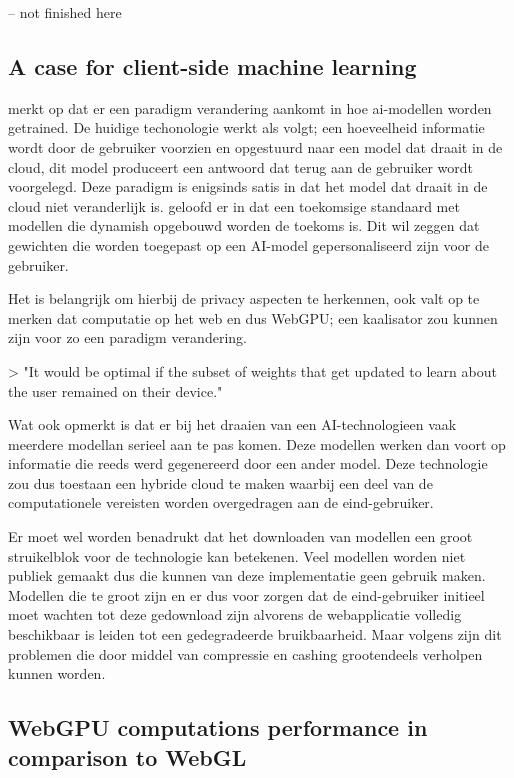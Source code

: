 -- not finished here


\subsection{A case for client-side machine learning} %

\textcite{Fleetwood2022} merkt op dat er een paradigm verandering aankomt in hoe ai-modellen worden getrained. De huidige techonologie werkt als volgt; een hoeveelheid informatie wordt door de gebruiker voorzien en opgestuurd naar een model dat draait in de cloud, dit model produceert een antwoord dat terug aan de gebruiker wordt voorgelegd. Deze paradigm is enigsinds satis in dat het model dat draait in de cloud niet veranderlijk is. \textcite{Fleetwood2022} geloofd er in dat een toekomsige standaard met modellen die dynamish opgebouwd worden de toekoms is. Dit wil zeggen dat gewichten die worden toegepast op een AI-model gepersonaliseerd zijn voor de gebruiker.

Het is belangrijk om hierbij de privacy aspecten te herkennen, ook valt op te merken dat computatie op het web en dus WebGPU; een kaalisator zou kunnen zijn voor zo een paradigm verandering.

> "It would be optimal if the subset of weights that get updated to learn about the user remained on their device." \autocite{Fleetwood2022}

Wat \textcite{Fleetwood2022} ook opmerkt is dat er bij het draaien van een AI-technologieen vaak meerdere modellan serieel aan te pas komen. Deze modellen werken dan voort op informatie die reeds werd gegenereerd door een ander model. Deze technologie zou dus toestaan een hybride cloud te maken waarbij een deel van de computationele vereisten worden overgedragen aan de eind-gebruiker.

Er moet wel worden benadrukt dat het downloaden van modellen een groot struikelblok voor de technologie kan betekenen. Veel modellen worden niet publiek gemaakt dus die kunnen van deze implementatie geen gebruik maken. Modellen die te groot zijn en er dus voor zorgen dat de eind-gebruiker initieel moet wachten tot deze gedownload zijn alvorens de webapplicatie volledig beschikbaar is leiden tot een gedegradeerde bruikbaarheid. Maar volgens \textcite{Fleetwood2022} zijn dit problemen die door middel van compressie en cashing grootendeels verholpen kunnen worden.

\subsection{WebGPU computations performance in comparison to WebGL} %

